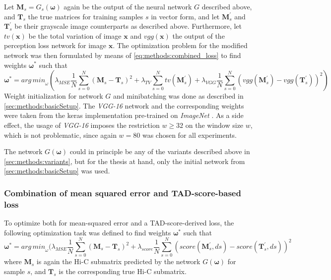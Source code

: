 Let $\mathbf{M}_s=G_s(\bm{\omega})$ again be the output of the neural network $G$ described above, and $\mathbf{T}_s$ the true matrices for training samples $s$ in vector form,
and let $\mathbf{M}^\prime_s$ and $\mathbf{T}^\prime_s$ be their grayscale image counterparts as described above.
Furthermore, let $\mathit{tv}(\mathbf{x})$ be the total variation of image $\mathbf{x}$ and $\mathit{vgg}(\mathbf{x})$ the output of the perception loss network for image $\mathbf{x}$.
The optimization problem for the modified network was then formulated by means of \cref{eq:methods:combined_loss} to find weights $\bm{\omega}^*$ such that
\begin{equation}
 \bm{\omega}^* = \mathit{arg\,min}_\omega (  \lambda_\mathit{MSE} \frac{1}{N} \sum_{s=0}^N (\mathbf{M}_s - \mathbf{T}_s)^2 
                                                     + \lambda_\mathit{TV} \sum_{s=0}^N \mathit{tv}( \mathbf{M}^\prime_s) 
                                                     + \lambda_\mathit{VGG} \frac{1}{N} \sum_{s=0}^N (\mathit{vgg}(\mathbf{M}^\prime_s) - \mathit{vgg}(\mathbf{T}^\prime_s))^2 ) \label{eq:methods:combined_loss}
\end{equation}
Weight initialization for network $G$ and minibatching was done as described in \cref{sec:methods:basicSetup}.
The \emph{VGG-16} network and the corresponding weights were taken from the keras implementation pre-trained on \emph{ImageNet} \cite{deng2009}.
As a side effect, the usage of \emph{VGG-16} imposes the restriction $w \geq 32$ on the window size $w$, which is not problematic, since again $w=80$ was chosen for all experiments.

The network $G(\bm{\omega})$ could in principle be any of the variants described above in \cref{sec:methods:variants},
but for the thesis at hand, only the initial network from \cref{sec:methods:basicSetup} was used.

\subsubsection{Combination of mean squared error and TAD-score-based loss} \label{sec:methods:score_loss}
To optimize both for mean-squared error and a TAD-score-derived loss, the following optimization task was defined to find weights $\bm{\omega}^*$ such that
\begin{equation}
 \bm{\omega}^* = \mathit{arg\,min}_\omega (  \lambda_\mathit{MSE} \frac{1}{N} \sum_{s=0}^N (\mathbf{M}_s - \mathbf{T}_s)^2
                                                    + \lambda_\mathit{score} \frac{1}{N} \sum_{s=0}^N (\mathit{score}(\mathbf{M}^\prime_s,ds) - \mathit{score}(\mathbf{T}^\prime_s,ds))^2 \label{eq:methods:score_loss}
\end{equation}
where $\mathbf{M}_s$ is again the Hi-C submatrix predicted by the network $G(\bm{\omega})$ for sample $s$, and $\mathbf{T}_s$ is the corresponding true Hi-C submatrix.

